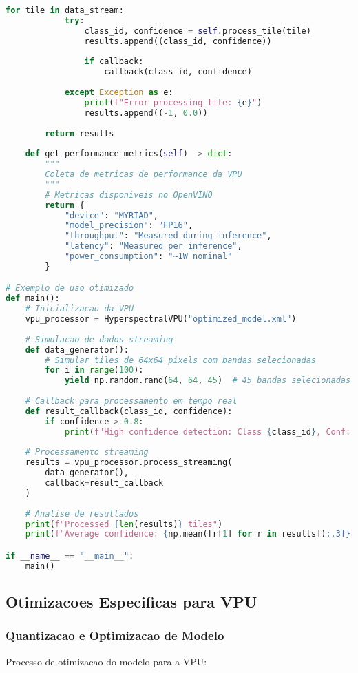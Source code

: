 \begin{lstlisting}[language=Python]
        for tile in data_stream:
            try:
                class_id, confidence = self.process_tile(tile)
                results.append((class_id, confidence))
                
                if callback:
                    callback(class_id, confidence)
                    
            except Exception as e:
                print(f"Error processing tile: {e}")
                results.append((-1, 0.0))
        
        return results
    
    def get_performance_metrics(self) -> dict:
        """
        Coleta de metricas de performance da VPU
        """
        # Metricas disponiveis no OpenVINO
        return {
            "device": "MYRIAD",
            "model_precision": "FP16",
            "throughput": "Measured during inference",
            "latency": "Measured per inference",
            "power_consumption": "~1W nominal"
        }

# Exemplo de uso otimizado
def main():
    # Inicializacao da VPU
    vpu_processor = HyperspectralVPU("optimized_model.xml")
    
    # Simulacao de dados streaming
    def data_generator():
        # Simular tiles de 64x64 pixels com bandas selecionadas
        for i in range(100):
            yield np.random.rand(64, 64, 45)  # 45 bandas selecionadas
    
    # Callback para processamento em tempo real
    def result_callback(class_id, confidence):
        if confidence > 0.8:
            print(f"High confidence detection: Class {class_id}, Conf: {confidence:.3f}")
    
    # Processamento streaming
    results = vpu_processor.process_streaming(
        data_generator(), 
        callback=result_callback
    )
    
    # Analise de resultados
    print(f"Processed {len(results)} tiles")
    print(f"Average confidence: {np.mean([r[1] for r in results]):.3f}")

if __name__ == "__main__":
    main()
\end{lstlisting}

\subsection{Otimizacoes Especificas para VPU}

\subsubsection{Quantizacao e Optimizacao de Modelo}
Processo de otimizacao do modelo para a VPU:

